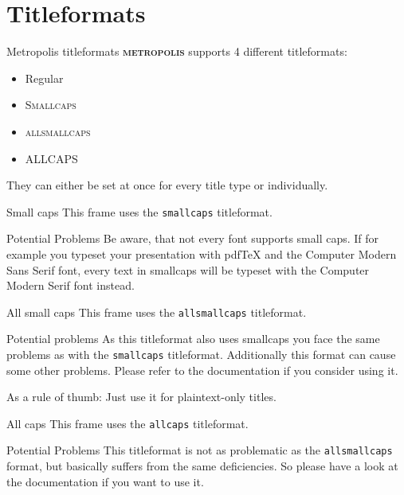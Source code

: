 \documentclass[10pt]{beamer}
\newcommand{\themename}{\textbf{\textsc{metropolis}}\xspace}
\begin{document}
\section{Titleformats}

\begin{frame}{Metropolis titleformats}
	\themename supports 4 different titleformats:
	\begin{itemize}
		\item Regular
		\item \textsc{Smallcaps}
		\item \textsc{allsmallcaps}
		\item ALLCAPS
	\end{itemize}
	They can either be set at once for every title type or individually.
\end{frame}

{
\begin{frame}{Small caps}
	This frame uses the \texttt{smallcaps} titleformat.

	\begin{alertblock}{Potential Problems}
		Be aware, that not every font supports small caps. If for example you typeset your presentation with pdfTeX and the Computer Modern Sans Serif font, every text in smallcaps will be typeset with the Computer Modern Serif font instead.
	\end{alertblock}
\end{frame}
}

{
\begin{frame}{All small caps}
	This frame uses the \texttt{allsmallcaps} titleformat.

	\begin{alertblock}{Potential problems}
		As this titleformat also uses smallcaps you face the same problems as with the \texttt{smallcaps} titleformat. Additionally this format can cause some other problems. Please refer to the documentation if you consider using it.

		As a rule of thumb: Just use it for plaintext-only titles.
	\end{alertblock}
\end{frame}
}

{
\begin{frame}{All caps}
	This frame uses the \texttt{allcaps} titleformat.

	\begin{alertblock}{Potential Problems}
		This titleformat is not as problematic as the \texttt{allsmallcaps} format, but basically suffers from the same deficiencies. So please have a look at the documentation if you want to use it.
	\end{alertblock}
\end{frame}
}
\end{document}
